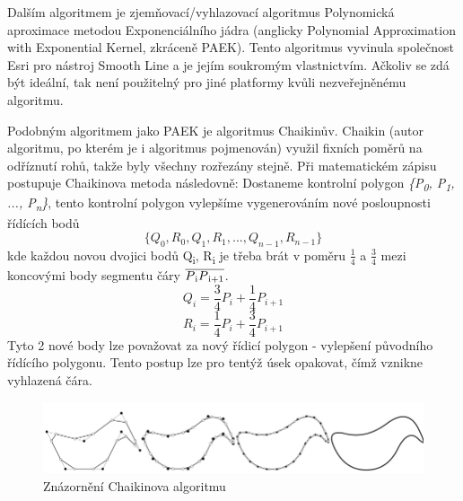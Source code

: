 Dalším algoritmem je zjemňovací/vyhlazovací algoritmus Polynomická aproximace metodou Exponenciálního jádra
(anglicky Polynomial Approximation with Exponential Kernel, zkráceně PAEK).
Tento algoritmus vyvinula společnost Esri pro nástroj Smooth Line a je jejím soukromým vlastnictvím.
Ačkoliv se zdá být ideální, tak není použitelný pro jiné platformy kvůli nezveřejněnému algoritmu.

Podobným algoritmem jako PAEK je algoritmus Chaikinův. 
Chaikin (autor algoritmu, po kterém je i algoritmus pojmenován) využil fixních poměrů na odříznutí rohů, takže byly všechny rozřezány stejně. 
Při matematickém zápisu postupuje Chaikinova metoda následovně: Dostaneme kontrolní polygon 
\textit{\{P\textsubscript{0}, P\textsubscript{1}, ..., P\textsubscript{n}\}},
tento kontrolní polygon vylepšíme vygenerováním nové posloupnosti řídících bodů 
\[ \{Q_0, R_0, Q_1, R_1, ...,  Q_{n−1}, R_{n−1}\} \]                                    
kde každou novou dvojici bodů Q\textsubscript{i}, R\textsubscript{i} je třeba brát v poměru \(\frac{1}{4}\)
a \(\frac{3}{4}\) mezi koncovými body segmentu čáry \(\overline{P\textsubscript{i}P\textsubscript{i+1}}\).
\[Q_i = \frac{3}{4}P_i + \frac{1}{4}P_{i+1}\]
\[R_i = \frac{1}{4}P_i + \frac{3}{4}P_{i+1}\]
Tyto 2 nové body lze považovat za nový řídicí polygon - vylepšení původního řídícího polygonu. 
Tento postup lze pro tentýž úsek opakovat, čímž vznikne vyhlazená čára. \cite{chaikin} 

\begin{figure}[H] \centering
    \includegraphics[width=400pt]{./pictures/chaiken.png}
    \caption[Znázornění Chaikinova algoritmu]{Znázornění Chaikinova algoritmu \cite{bayer-douglas}}
	\label{fig:chaiken}              
\end{figure} 
